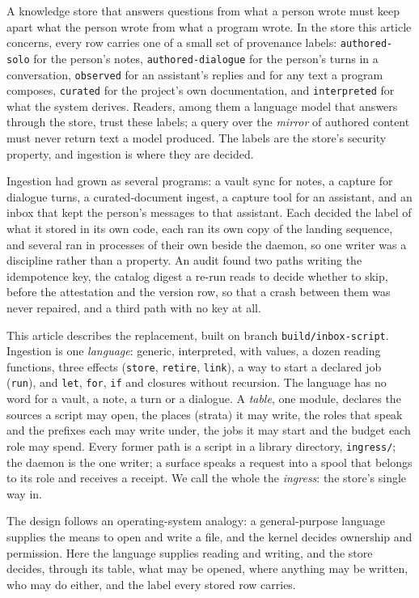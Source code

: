 \documentclass[11pt]{article}
\theoremstyle{plain}
\theoremstyle{definition}
\theoremstyle{remark}
\newcommand{\code}[1]{\texttt{#1}}
\begin{document}
A knowledge store that answers questions from what a person wrote must keep apart what the
person wrote from what a program wrote. In the store this article concerns, every row carries
one of a small set of provenance labels: \code{authored-solo} for the person's notes,
\code{authored-dialogue} for the person's turns in a conversation, \code{observed} for an
assistant's replies and for any text a program composes, \code{curated} for the project's own
documentation, and \code{interpreted} for what the system derives. Readers, among them a
language model that answers through the store, trust these labels; a query over the
\emph{mirror} of authored content must never return text a model produced. The labels are the
store's security property, and ingestion is where they are decided.

Ingestion had grown as several programs: a vault sync for notes, a capture for dialogue turns,
a curated-document ingest, a capture tool for an assistant, and an inbox that kept the person's
messages to that assistant. Each decided the label of what it stored in its own code, each ran
its own copy of the landing sequence, and several ran in processes of their own beside the
daemon, so one writer was a discipline rather than a property. An audit found two paths writing
the idempotence key, the catalog digest a re-run reads to decide whether to skip, before the
attestation and the version row, so that a crash between them was never repaired, and a third
path with no key at all.

This article describes the replacement, built on branch \code{build/inbox-script}. Ingestion is
one \emph{language}: generic, interpreted, with values, a dozen reading functions, three effects
(\code{store}, \code{retire}, \code{link}), a way to start a declared job (\code{run}), and
\code{let}, \code{for}, \code{if} and closures without recursion. The language has no word for
a vault, a note, a turn or a dialogue. A \emph{table}, one module, declares the sources a script
may open, the places (strata) it may write, the roles that speak and the prefixes each may write
under, the jobs it may start and the budget each role may spend. Every former path is a script
in a library directory, \code{ingress/}; the daemon is the one writer; a surface speaks a
request into a spool that belongs to its role and receives a receipt. We call the whole the
\emph{ingress}: the store's single way in.

The design follows an operating-system analogy: a general-purpose language supplies the means
to open and write a file, and the kernel decides ownership and permission. Here the language
supplies reading and writing, and the store decides, through its table, what may be opened,
where anything may be written, who may do either, and the label every stored row carries.
\end{document}
